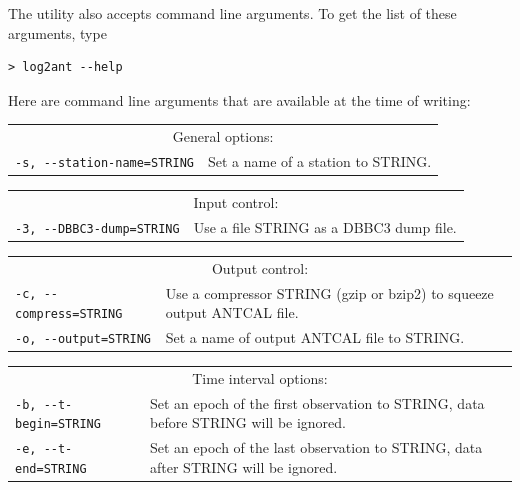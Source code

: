 \documentclass [10pt,letterpaper]{report}
\begin{document}
The utility also accepts command line arguments. To get the list of these
arguments, type

\begin{verbatim}
> log2ant --help
\end{verbatim}
\noindent
Here are command line arguments that are available at the time of writing:
\vspace{5mm}

\begin{tabular}{p{\leftSp}p{\riteSp}}
\multicolumn{2}{c}{General options:}\\
{\tt -s, -{}-station-name=STRING}  & Set a name of a station to STRING.\\
\end{tabular}
\vspace{5mm}

\begin{tabular}{p{\leftSp}p{\riteSp}}
\multicolumn{2}{c}{Input control:}\\
{\tt -3, -{}-DBBC3-dump=STRING}    & Use a file STRING as a DBBC3 dump file.\\
\end{tabular}
\vspace{5mm}

\begin{tabular}{p{\leftSp}p{\riteSp}}
\multicolumn{2}{c}{Output control:}\\
{\tt -c, -{}-compress=STRING}      & Use a compressor STRING (gzip or bzip2) to squeeze output ANTCAL file.\\
{\tt -o, -{}-output=STRING}        & Set a name of output ANTCAL file to STRING.\\
\end{tabular}
\vspace{5mm}

\begin{tabular}{p{\leftSp}p{\riteSp}}
\multicolumn{2}{c}{Time interval options:}\\
{\tt -b, -{}-t-begin=STRING}       & Set an epoch of the first observation to STRING, data before STRING will be ignored.\\
{\tt -e, -{}-t-end=STRING}         & Set an epoch of the last observation to STRING, data after STRING will be ignored.\\
\end{tabular}
\vspace{5mm}
\end{document}

